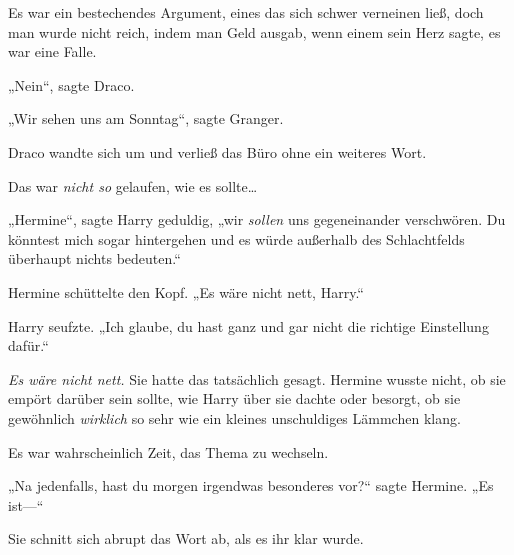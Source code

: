 Es war ein bestechendes Argument, eines das sich schwer verneinen ließ, doch man wurde nicht reich, indem man Geld ausgab, wenn einem sein Herz sagte, es war eine Falle.

„Nein“, sagte Draco.

„Wir sehen uns am Sonntag“, sagte Granger.

Draco wandte sich um und verließ das Büro ohne ein weiteres Wort.

Das war \emph{nicht so} gelaufen, wie es sollte…

\later

„Hermine“, sagte Harry geduldig, „wir \emph{sollen} uns gegeneinander verschwören. Du könntest mich sogar hintergehen und es würde außerhalb des Schlachtfelds überhaupt nichts bedeuten.“

Hermine schüttelte den Kopf. „Es wäre nicht nett, Harry.“

Harry seufzte. „Ich glaube, du hast ganz und gar nicht die richtige Einstellung dafür.“

\emph{Es wäre nicht nett.} Sie hatte das tatsächlich gesagt. Hermine wusste nicht, ob sie empört darüber sein sollte, wie Harry über sie dachte oder besorgt, ob sie gewöhnlich \emph{wirklich} so sehr wie ein kleines unschuldiges Lämmchen klang.

Es war wahrscheinlich Zeit, das Thema zu wechseln.

„Na jedenfalls, hast du morgen irgendwas besonderes vor?“ sagte Hermine. „Es ist—“

Sie schnitt sich abrupt das Wort ab, als es ihr klar wurde.

